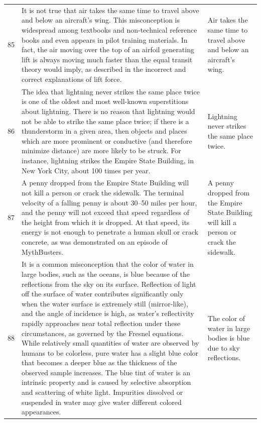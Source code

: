 \begin{tabular}{c|p{}|p{}}
85 & It is not true that air takes the same time to travel above and below an aircraft's wing. This misconception is widespread among textbooks and non-technical reference books and even appears in pilot training materials. In fact, the air moving over the top of an airfoil generating lift is always moving much faster than the equal transit theory would imply, as described in the incorrect and correct explanations of lift force. & Air takes the same time to travel above and below an aircraft's wing. \\
86 & The idea that lightning never strikes the same place twice is one of the oldest and most well-known superstitions about lightning. There is no reason that lightning would not be able to strike the same place twice; if there is a thunderstorm in a given area, then objects and places which are more prominent or conductive (and therefore minimize distance) are more likely to be struck. For instance, lightning strikes the Empire State Building, in New York City, about 100 times per year. & Lightning never strikes the same place twice. \\
87 & A penny dropped from the Empire State Building will not kill a person or crack the sidewalk. The terminal velocity of a falling penny is about 30–50 miles per hour, and the penny will not exceed that speed regardless of the height from which it is dropped. At that speed, its energy is not enough to penetrate a human skull or crack concrete, as was demonstrated on an episode of MythBusters. & A penny dropped from the Empire State Building will kill a person or crack the sidewalk. \\
88 & It is a common misconception that the color of water in large bodies, such as the oceans, is blue because of the reflections from the sky on its surface. Reflection of light off the surface of water contributes significantly only when the water surface is extremely still (mirror-like), and the angle of incidence is high, as water's reflectivity rapidly approaches near total reflection under these circumstances, as governed by the Fresnel equations. While relatively small quantities of water are observed by humans to be colorless, pure water has a slight blue color that becomes a deeper blue as the thickness of the observed sample increases. The blue tint of water is an intrinsic property and is caused by selective absorption and scattering of white light. Impurities dissolved or suspended in water may give water different colored appearances. & The color of water in large bodies is blue due to sky reflections. \\

\end{tabular}
